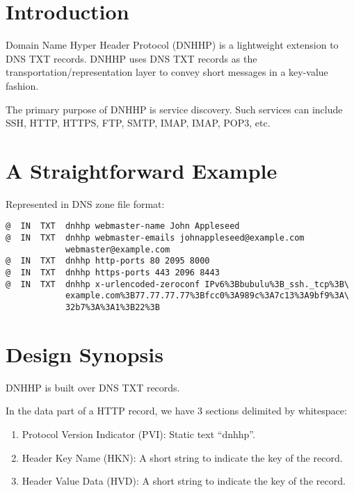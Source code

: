 \documentclass[a4paper,11pt]{article}
\begin{document}

\fulldoctitle


\section*{Introduction}

Domain Name Hyper Header Protocol (DNHHP) is a lightweight extension to DNS TXT records.
DNHHP uses DNS TXT records as the transportation/representation layer to convey short messages in a key-value fashion.

The primary purpose of DNHHP is service discovery.
Such services can include SSH, HTTP, HTTPS, FTP, SMTP, IMAP, IMAP, POP3, etc.

\tableofcontents\clearpage




\section{A Straightforward Example}

Represented in DNS zone file format:

\begin{lstlisting}
@  IN  TXT  dnhhp webmaster-name John Appleseed
@  IN  TXT  dnhhp webmaster-emails johnappleseed@example.com
            webmaster@example.com
@  IN  TXT  dnhhp http-ports 80 2095 8000
@  IN  TXT  dnhhp https-ports 443 2096 8443
@  IN  TXT  dnhhp x-urlencoded-zeroconf IPv6%3Bbubulu%3B_ssh._tcp%3B\
            example.com%3B77.77.77.77%3Bfcc0%3A989c%3A7c13%3A9bf9%3A\
            32b7%3A%3A1%3B22%3B
\end{lstlisting}







\section{Design Synopsis}

DNHHP is built over DNS TXT records.

In the data part of a HTTP record, we have 3 sections delimited by whitespace:

\begin{enumerate}
	\item Protocol Version Indicator (PVI): Static text ``dnhhp''.
	\item Header Key Name (HKN): A short string to indicate the key of the record.
	\item Header Value Data (HVD): A short string to indicate the key of the record.
\end{enumerate}
\end{document}
